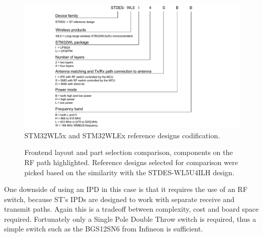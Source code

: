 \begin{figure}
    \includegraphics[width=\textwidth]{fig/STDES-xxxxxxx.png}
    \caption{\label{fig:reference-design-codification}STM32WL5x and STM32WLEx reference designs codification.}
\end{figure}

\begin{figure}
    \centering
    \hfil
    \hfil
    \caption{\label{fig:frontend-comparison} Frontend layout and part selection comparison, components on the RF path highlighted. Reference designs selected for comparison were picked based on the similarity with the STDES-WL5U4ILH design.}
\end{figure}

One downside of using an IPD in this case is that it requires the use of an RF switch, because ST's IPDs are designed to work with separate receive and transmit paths. Again this is a tradeoff between complexity, cost and board space required. Fortunately only a Single Pole Double Throw switch is required, thus a simple switch such as the BGS12SN6 from Infineon \cite{infineon_technologies_bgs12sn6_2024} is sufficient.

